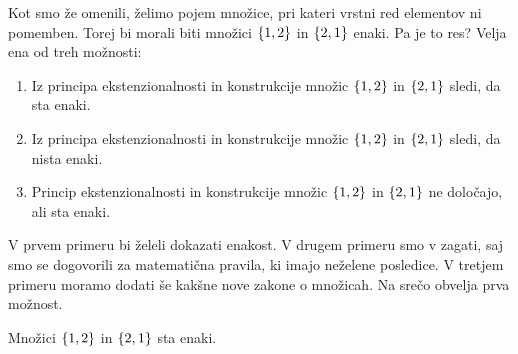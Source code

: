 Kot smo že omenili, želimo pojem množice, pri kateri vrstni red elementov ni pomemben.
Torej bi morali biti množici $\set{1, 2}$ in $\set{2, 1}$ enaki. Pa je to res? Velja ena
od treh možnosti:
%
\begin{enumerate}
\item Iz principa ekstenzionalnosti in konstrukcije množic $\set{1, 2}$ in $\set{2, 1}$ sledi, da sta enaki.
\item Iz principa ekstenzionalnosti in konstrukcije množic $\set{1, 2}$ in $\set{2, 1}$ sledi, da nista enaki.
\item Princip ekstenzionalnosti in konstrukcije množic $\set{1, 2}$ in $\set{2, 1}$ ne določajo, ali sta enaki.
\end{enumerate}
%
V prvem primeru bi želeli dokazati enakost. V drugem primeru smo v zagati, saj smo se
dogovorili za matematična pravila, ki imajo neželene posledice. V tretjem primeru moramo
dodati še kakšne nove zakone o množicah. Na srečo obvelja prva možnost.

\begin{trditev}
  Množici $\set{1, 2}$ in $\set{2, 1}$ sta enaki.
\end{trditev}

